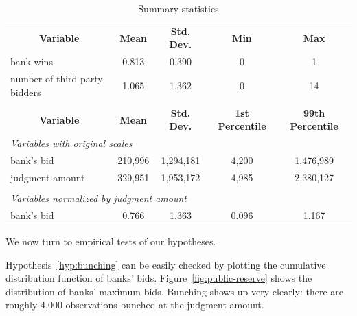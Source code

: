 \documentclass[11pt,twopage]{article}
\begin{document}
\begin{table}[!htbp]
\centering \caption{Summary statistics \label{sumstat}}
\begin{tabular}{lcccc}
&&&&\\
\hline
\multicolumn{1}{c}{\textbf{Variable}}&\textbf{Mean}  & \textbf{Std. Dev.} 
& \textbf{Min}& \textbf{Max} \tabularnewline
\hline
bank wins & 0.813 & 0.390 & 0 & 1 \\
number of third-party bidders & 1.065 & 1.362 & 0 & 14 \\


&&&&\\
\hline
\multicolumn{1}{c}{\textbf{Variable}}&\textbf{Mean}  & \textbf{Std. Dev.} 
& \textbf{1st Percentile}& \textbf{99th Percentile} \tabularnewline
\hline
\multicolumn{3}{l}{\textit{Variables with original scales}}&&\\

bank's bid & 210,996 & 1,294,181 & 4,200 & 1,476,989 \\
judgment amount & 329,951 & 1,953,172 & 4,985 & 2,380,127 \\

&&&&\\
\multicolumn{3}{l}{\textit{Variables normalized by judgment amount}}&&\\

bank's bid & 0.766 & 1.363 & 0.096 & 1.167 \\
\hline
\end{tabular}
\end{table}

We now turn to empirical tests of our hypotheses. 

Hypothesis~\ref{hyp:bunching} can be easily checked by plotting the cumulative distribution function of banks' bids. Figure~\ref{fig:public-reserve} shows the distribution of banks' maximum bids. Bunching shows up very clearly: there are roughly 4,000 observations bunched at the judgment amount.
\end{document}
